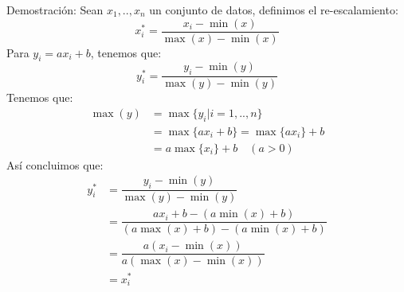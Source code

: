 \documentclass[a4paper,11pt]{article}
\begin{document}
\begin{demostracion}{Demostración:}
    Sean $x_1,..,x_n$ un conjunto de datos, definimos el re-escalamiento:
    \[
    x_i^*=\dfrac{x_i-\min(x)}{\max(x)-\min(x)}
    \]
Para $y_i=a x_i+b$, tenemos que:
\[
y_i^*=\dfrac{y_i-\min(y)}{\max(y)-\min(y)}
\]
Tenemos que:
\begin{align*}
    \max (y)&=\max \{y_i| i=1,..,n\}\\
    &=\max\{ ax_i+b \}=\max\{ ax_i \}+b\\
    &=a\max\{ x_i \}+b  \quad (a>0)
\end{align*}
Así concluimos que:
\begin{align*}
    y_i^*&=\dfrac{y_i-\min(y)}{\max(y)-\min(y)}\\
    &=\dfrac{ax_i+b-(a\min(x)+b)}{(a\max(x)+b)-(a\min(x)+b)}\\
    &=\dfrac{a(x_i-\min(x))}{a(\max(x)-\min(x))}\\
    &=x_i^*
\end{align*}
\end{demostracion}
\newpage
\end{document}
